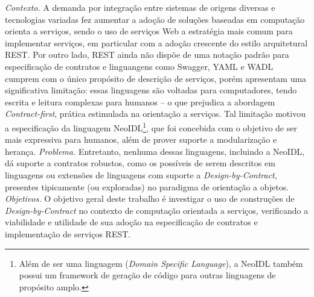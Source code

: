 
\vspace{5mm}

 
\vspace{5mm} 






\emph{Contexto.}
A demanda por integração entre sistemas de origens diversas e tecnologias
variadas fez aumentar a adoção de soluções baseadas em computação orienta a
serviços, sendo o uso de servi\-ços Web a estratégia mais comum para implementar
serviços, em particular com a adoção crescente do estilo arquitetural REST.
Por outro lado, REST ainda não dispõe de uma notação padrão para especificação
de contratos e linguangens como Swagger, YAML e WADL cumprem com o
único propósito de descrição de serviços, porém apresentam uma significativa
limitação: essas linguagens
são voltadas para computadores, tendo escrita e leitura complexas para
humanos -- o que prejudica a abordagem \textit{Contract-first}, prática
estimulada na orientação a serviços. Tal limitação motivou a especificação da
linguagem NeoIDL\footnote{Além de ser uma linguagem (\textit{Domain Specific
Language}), a NeoIDL também possui um framework de geração de código para outras linguagens de propósito
amplo.}, que foi concebida com o objetivo de ser mais expressiva para humanos,
além de prover suporte a modularização e herança.
\emph{Problema.} Entretanto, nenhuma dessas linguagens, incluindo a NeoIDL, dá
suporte a contratos robustos, como os possíveis de serem descritos em
linguagens ou extensões de linguagens com suporte a \emph{Design-by-Contract},
presentes tipicamente (ou exploradas) no paradigma de orientação a objetos.
\emph{Objetivos.}
O objetivo geral deste trabalho é investigar o uso de construções de
\textit{Design-by-Contract} no contexto de computação orientada a serviços,
verificando a viabilidade e utilidade de sua adoção na especificação de
contratos e implementação de serviços REST.
%
